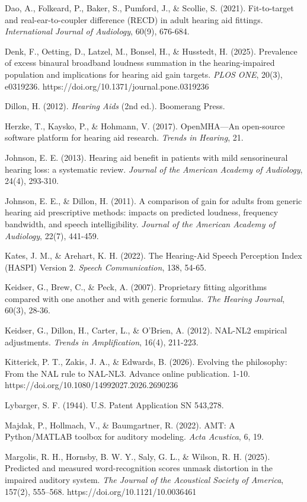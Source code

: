 \documentclass[
  12pt,
]{article}
\begin{document}
Dao, A., Folkeard, P., Baker, S., Pumford, J., \& Scollie, S. (2021).
Fit-to-target and real-ear-to-coupler difference (RECD) in adult hearing
aid fittings. \emph{International Journal of Audiology}, 60(9), 676-684.

Denk, F., Oetting, D., Latzel, M., Bonsel, H., \& Husstedt, H. (2025).
Prevalence of excess binaural broadband loudness summation in the
hearing-impaired population and implications for hearing aid gain
targets. \emph{PLOS ONE}, 20(3), e0319236.
https://doi.org/10.1371/journal.pone.0319236

Dillon, H. (2012). \emph{Hearing Aids} (2nd ed.). Boomerang Press.

Herzke, T., Kaysko, P., \& Hohmann, V. (2017). OpenMHA---An open-source
software platform for hearing aid research. \emph{Trends in Hearing},
21.

Johnson, E. E. (2013). Hearing aid benefit in patients with mild
sensorineural hearing loss: a systematic review. \emph{Journal of the
American Academy of Audiology}, 24(4), 293-310.

Johnson, E. E., \& Dillon, H. (2011). A comparison of gain for adults
from generic hearing aid prescriptive methods: impacts on predicted
loudness, frequency bandwidth, and speech intelligibility. \emph{Journal
of the American Academy of Audiology}, 22(7), 441-459.

Kates, J. M., \& Arehart, K. H. (2022). The Hearing-Aid Speech
Perception Index (HASPI) Version 2. \emph{Speech Communication}, 138,
54-65.

Keidser, G., Brew, C., \& Peck, A. (2007). Proprietary fitting
algorithms compared with one another and with generic formulas.
\emph{The Hearing Journal}, 60(3), 28-36.

Keidser, G., Dillon, H., Carter, L., \& O'Brien, A. (2012). NAL-NL2
empirical adjustments. \emph{Trends in Amplification}, 16(4), 211-223.

Kitterick, P. T., Zakis, J. A., \& Edwards, B. (2026). Evolving the
philosophy: From the NAL rule to NAL-NL3. Advance online publication.
1-10. https://doi.org/10.1080/14992027.2026.2690236

Lybarger, S. F. (1944). U.S. Patent Application SN 543,278.

Majdak, P., Hollmach, V., \& Baumgartner, R. (2022). AMT: A
Python/MATLAB toolbox for auditory modeling. \emph{Acta Acustica}, 6,
19.

Margolis, R. H., Hornsby, B. W. Y., Saly, G. L., \& Wilson, R. H.
(2025). Predicted and measured word-recognition scores unmask distortion
in the impaired auditory system. \emph{The Journal of the Acoustical
Society of America}, 157(2), 555--568.
https://doi.org/10.1121/10.0036461
\end{document}
